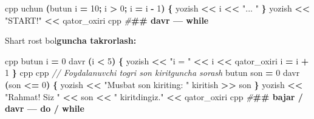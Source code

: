 \documentclass[a4paper,11pt,twoside,openright]{book}
\newenvironment{Shaded}{\begin{snugshade}}{\end{snugshade}}
\newcommand{\CharTok}[1]{\textcolor[rgb]{0.31,0.60,0.02}{#1}}
\newcommand{\CommentTok}[1]{\textcolor[rgb]{0.56,0.35,0.01}{\textit{#1}}}
\newcommand{\DecValTok}[1]{\textcolor[rgb]{0.00,0.00,0.81}{#1}}
\newcommand{\ErrorTok}[1]{\textcolor[rgb]{0.64,0.00,0.00}{\textbf{#1}}}
\newcommand{\NormalTok}[1]{#1}
\newcommand{\OperatorTok}[1]{\textcolor[rgb]{0.81,0.36,0.00}{\textbf{#1}}}
\newcommand{\PreprocessorTok}[1]{\textcolor[rgb]{0.56,0.35,0.01}{\textit{#1}}}
\newcommand{\StringTok}[1]{\textcolor[rgb]{0.31,0.60,0.02}{#1}}
\begin{document}
\begin{Shaded}
\begin{Highlighting}[]
\ErrorTok{\textasciigrave{}\textasciigrave{}\textasciigrave{}}\NormalTok{cpp}
\NormalTok{uchun }\OperatorTok{(}\NormalTok{butun i }\OperatorTok{=} \DecValTok{10}\OperatorTok{;}\NormalTok{ i }\OperatorTok{\textgreater{}} \DecValTok{0}\OperatorTok{;}\NormalTok{ i }\OperatorTok{=}\NormalTok{ i }\OperatorTok{{-}} \DecValTok{1}\OperatorTok{)} \OperatorTok{\{}
\NormalTok{    yozish }\OperatorTok{\textless{}\textless{}}\NormalTok{ i }\OperatorTok{\textless{}\textless{}} \StringTok{"... "} 
\OperatorTok{\}}
\NormalTok{yozish }\OperatorTok{\textless{}\textless{}} \StringTok{"START!"} \OperatorTok{\textless{}\textless{}}\NormalTok{ qator\_oxiri}
\ErrorTok{\textasciigrave{}\textasciigrave{}\textasciigrave{}}\NormalTok{cpp}
\PreprocessorTok{\#}\ErrorTok{\#\# \textasciigrave{}davr\textasciigrave{} — \textasciigrave{}while\textasciigrave{}}

\NormalTok{Shart rost bo}\CharTok{\textquotesingle{}l}\ErrorTok{guncha takrorlash:}

\ErrorTok{\textasciigrave{}\textasciigrave{}\textasciigrave{}}\NormalTok{cpp}
\NormalTok{butun i }\OperatorTok{=} \DecValTok{0}
\NormalTok{davr }\OperatorTok{(}\NormalTok{i }\OperatorTok{\textless{}} \DecValTok{5}\OperatorTok{)} \OperatorTok{\{}
\NormalTok{    yozish }\OperatorTok{\textless{}\textless{}} \StringTok{"i = "} \OperatorTok{\textless{}\textless{}}\NormalTok{ i }\OperatorTok{\textless{}\textless{}}\NormalTok{ qator\_oxiri}
\NormalTok{    i }\OperatorTok{=}\NormalTok{ i }\OperatorTok{+} \DecValTok{1}
\OperatorTok{\}}
\ErrorTok{\textasciigrave{}\textasciigrave{}\textasciigrave{}}\NormalTok{cpp}
\ErrorTok{\textasciigrave{}\textasciigrave{}\textasciigrave{}}\NormalTok{cpp}
\CommentTok{// Foydalanuvchi to\textquotesingle{}g\textquotesingle{}ri son kiritguncha so\textquotesingle{}rash}
\NormalTok{butun son }\OperatorTok{=} \DecValTok{0}
\NormalTok{davr }\OperatorTok{(}\NormalTok{son }\OperatorTok{\textless{}=} \DecValTok{0}\OperatorTok{)} \OperatorTok{\{}
\NormalTok{    yozish }\OperatorTok{\textless{}\textless{}} \StringTok{"Musbat son kiriting: "}
\NormalTok{    kiritish }\OperatorTok{\textgreater{}\textgreater{}}\NormalTok{ son}
\OperatorTok{\}}
\NormalTok{yozish }\OperatorTok{\textless{}\textless{}} \StringTok{"Rahmat! Siz "} \OperatorTok{\textless{}\textless{}}\NormalTok{ son }\OperatorTok{\textless{}\textless{}} \StringTok{" kiritdingiz."} \OperatorTok{\textless{}\textless{}}\NormalTok{ qator\_oxiri}
\ErrorTok{\textasciigrave{}\textasciigrave{}\textasciigrave{}}\NormalTok{cpp}
\PreprocessorTok{\#}\ErrorTok{\#\# \textasciigrave{}bajar\textasciigrave{} / \textasciigrave{}davr\textasciigrave{} — \textasciigrave{}do\textasciigrave{} / \textasciigrave{}while\textasciigrave{}}


\end{Highlighting}
\end{Shaded}
\end{document}
